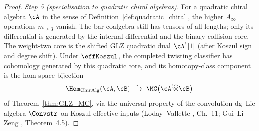 \begin{proof}
\emph{Step 5 \textup(specialisation to quadratic chiral algebras\textup).}
For a quadratic chiral algebra $\cA$ in the sense of
Definition~\ref{def:quadratic_chiral}, the higher $A_\infty$ operations
$m_{\geq 3}$ vanish. The bar coalgebra still has tensors of all
lengths; only its differential is generated by the internal
differential and the binary collision core. The weight-two core is
the shifted GLZ quadratic dual $\cA^!\,[1]$
\textup(after Koszul sign and degree shift\textup). Under
$\effKoszul$, the completed twisting classifier has cohomology
generated by this quadratic core, and its homotopy-class component is
the hom-space bijection
\[
\Hom_{\mathrm{ChirAlg}}(\cA, \cB)
 \;\xrightarrow{\sim}\;
 \MC\bigl(\cA^! \widehat\otimes \cB\bigr)
\]
of Theorem~\ref{thm:GLZ_MC}, via the universal property of the
convolution dg~Lie algebra $\Convstr$ on Koszul-effective inputs
\textup(Loday--Vallette \cite{LV12}, Ch.~11; Gui--Li--Zeng
\cite{GLZ22}, Theorem~4.5\textup).
\end{proof}

